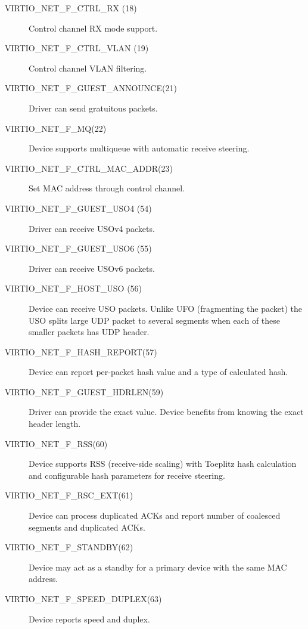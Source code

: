 \begin{description}
\item[VIRTIO_NET_F_CTRL_RX (18)] Control channel RX mode support.

\item[VIRTIO_NET_F_CTRL_VLAN (19)] Control channel VLAN filtering.

\item[VIRTIO_NET_F_GUEST_ANNOUNCE(21)] Driver can send gratuitous
    packets.

\item[VIRTIO_NET_F_MQ(22)] Device supports multiqueue with automatic
    receive steering.

\item[VIRTIO_NET_F_CTRL_MAC_ADDR(23)] Set MAC address through control
    channel.

\item[VIRTIO_NET_F_GUEST_USO4 (54)] Driver can receive USOv4 packets.

\item[VIRTIO_NET_F_GUEST_USO6 (55)] Driver can receive USOv6 packets.

\item[VIRTIO_NET_F_HOST_USO (56)] Device can receive USO packets. Unlike UFO
 (fragmenting the packet) the USO splits large UDP packet
 to several segments when each of these smaller packets has UDP header.

\item[VIRTIO_NET_F_HASH_REPORT(57)] Device can report per-packet hash
    value and a type of calculated hash.

\item[VIRTIO_NET_F_GUEST_HDRLEN(59)] Driver can provide the exact 
    value. Device benefits from knowing the exact header length.

\item[VIRTIO_NET_F_RSS(60)] Device supports RSS (receive-side scaling)
    with Toeplitz hash calculation and configurable hash
    parameters for receive steering.

\item[VIRTIO_NET_F_RSC_EXT(61)] Device can process duplicated ACKs
    and report number of coalesced segments and duplicated ACKs.

\item[VIRTIO_NET_F_STANDBY(62)] Device may act as a standby for a primary
    device with the same MAC address.

\item[VIRTIO_NET_F_SPEED_DUPLEX(63)] Device reports speed and duplex.
\end{description}

